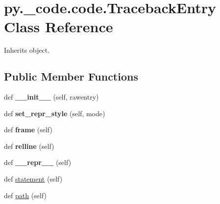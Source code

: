 \hypertarget{classpy_1_1__code_1_1code_1_1_traceback_entry}{}\section{py.\+\_\+code.\+code.\+Traceback\+Entry Class Reference}
\label{classpy_1_1__code_1_1code_1_1_traceback_entry}


Inherits object.

\subsection*{Public Member Functions}
\begin{DoxyCompactItemize}
\item 
\mbox{\label{classpy_1_1__code_1_1code_1_1_traceback_entry_a3a12c5c5e46d243c9cc56ded04c70d7f}} 
def {\bfseries \+\_\+\+\_\+init\+\_\+\+\_\+} (self, rawentry)
\item 
\mbox{\label{classpy_1_1__code_1_1code_1_1_traceback_entry_a6afdf5eb4d64824c3309c20823508023}} 
def {\bfseries set\+\_\+repr\+\_\+style} (self, mode)
\item 
\mbox{\label{classpy_1_1__code_1_1code_1_1_traceback_entry_a6cbcc8b8dff99c3932aaecc76b3aba22}} 
def {\bfseries frame} (self)
\item 
\mbox{\label{classpy_1_1__code_1_1code_1_1_traceback_entry_aab27c2bfdda0681d7c41d92f126b5a39}} 
def {\bfseries relline} (self)
\item 
\mbox{\label{classpy_1_1__code_1_1code_1_1_traceback_entry_a3a0cfc86175668f09306a96c523c80bd}} 
def {\bfseries \+\_\+\+\_\+repr\+\_\+\+\_\+} (self)
\item 
def \hyperlink{classpy_1_1__code_1_1code_1_1_traceback_entry_ab56d85c65cd337dc6112c87ad74a3f1c}{statement} (self)
\item 
def \hyperlink{classpy_1_1__code_1_1code_1_1_traceback_entry_a2ed5c5dbd76cc8fbae472d10c1eadba5}{path} (self)
\item 
\mbox{\label{classpy_1_1__code_1_1code_1_1_traceback_entry_ad351b015d355d411ad2672661d98f085}} 

\end{DoxyCompactItemize}
